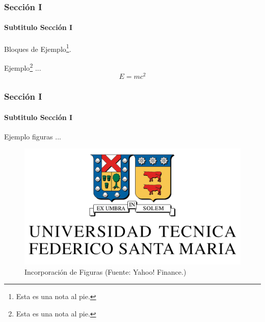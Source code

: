 \documentclass[
	9pt,
]{beamer}
\numberwithin{equation}{section}
\begin{document}
%
\begin{frame}
\frametitle{Sección I}
\framesubtitle{Subtitulo Sección I}
	Bloques de Ejemplo\footnote{Esta es una nota al pie.}.
	\begin{example}
	Ejemplo\footnote{Esta es una nota al pie.} ...
	\begin{equation*}
	E =mc^2
	\end{equation*}

	\end{example}
\end{frame}

%
\begin{frame}
\frametitle{Sección I}
\framesubtitle{Subtitulo Sección I}
	\begin{example}
	Ejemplo figuras ...
	
	\begin{figure}
	\centering
	\includegraphics[width=.85\textwidth]{logo_usm.png}
	\caption{Incorporación de Figuras {\tiny (Fuente: Yahoo! Finance.)}}
	\end{figure}
	
	\end{example}

\end{frame}
\end{document}
